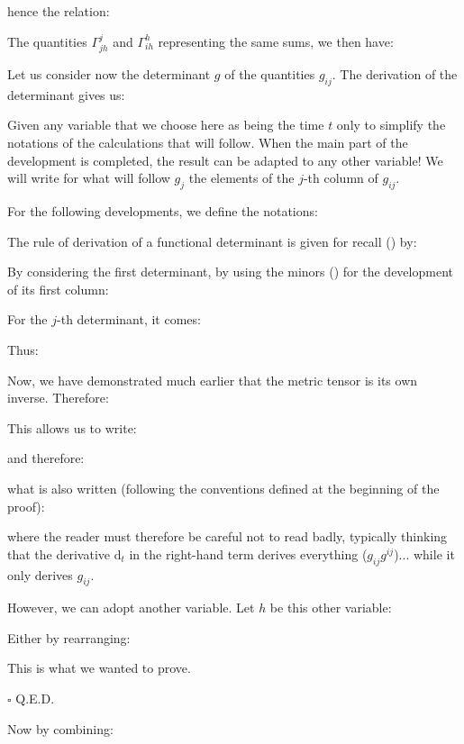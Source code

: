 	hence the relation:
	
	The quantities $\Gamma_{jh}^j$ and $\Gamma_{ih}^h$ representing the same sums, we then have:
	
	\begin{theorem}
	Let us consider now the determinant $g$ of the quantities $g_{ij}$. The derivation of the determinant gives us:
	
	\end{theorem}
	\begin{dem}
	Given any variable that we choose here as being the time $t$ only to simplify the notations of the calculations that will follow. When the main part of the development is completed, the result can be adapted to any other variable! We will write for what will follow $g_j$ the elements of the $j$-th column of $g_{ij}$.

	For the following developments, we define the notations:
	
	The rule of derivation of a functional determinant is given for recall () by:
	
	By considering the first determinant, by using the minors () for the development of its first column:
	
	For the $j$-th determinant, it comes:
	
	Thus:
	
	Now, we have demonstrated much earlier that the metric tensor is its own inverse. Therefore:
	
	This allows us to write:
	
	and therefore:
	
	what is also written (following the conventions defined at the beginning of the proof):
	
	where the reader must therefore be careful not to read badly, typically thinking that the derivative $\mathrm{d}_t$ in the right-hand term derives everything ($g_{ij}g^{ij}$)... while it only derives $g_{ij}$.
	
	However, we can adopt another variable. Let $h$ be this other variable:
	
	Either by rearranging:
	
	This is what we wanted to prove.
	\begin{flushright}
		$\square$  Q.E.D.
	\end{flushright}
	\end{dem}
	Now by combining:
	

